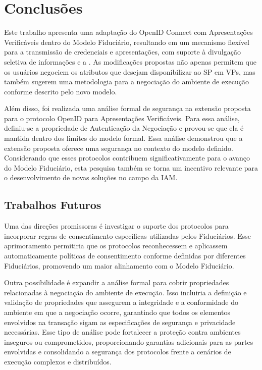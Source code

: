 \newpage
\section{Conclusões} \label{section:conclusion}

Este trabalho apresenta uma adaptação do OpenID Connect com Apresentações Verificáveis dentro do Modelo Fiduciário, resultando em um mecanismo flexível para a transmissão de credenciais e apresentações, com suporte à divulgação seletiva de informações e a . As modificações propostas não apenas permitem que os usuários negociem os atributos que desejam disponibilizar ao \acs{SP} em \acs{VP}s, mas também sugerem uma metodologia para a negociação do ambiente de execução conforme descrito pelo novo modelo. 

Além disso, foi realizada uma análise formal de segurança na extensão proposta para o protocolo OpenID para Apresentações Verificáveis. Para essa análise, definiu-se a propriedade de Autenticação da Negociação e provou-se que ela é mantida dentro dos limites do modelo formal. Essa análise demonstrou que a extensão proposta oferece uma segurança no contexto do modelo definido. Considerando que esses protocolos contribuem significativamente para o avanço do Modelo Fiduciário, esta pesquisa também se torna um incentivo relevante para o desenvolvimento de novas soluções no campo da \acs{IAM}.

\subsection*{Trabalhos Futuros}

Uma das direções promissoras é investigar o suporte dos protocolos para incorporar regras de consentimento específicas utilizadas pelos Fiduciários. Esse aprimoramento permitiria que os protocolos reconhecessem e aplicassem automaticamente políticas de consentimento conforme definidas por diferentes Fiduciários, promovendo um maior alinhamento com o Modelo Fiduciário.

Outra possibilidade é expandir a análise formal para cobrir propriedades relacionadas à negociação do ambiente de execução. Isso incluiria a definição e validação de propriedades que assegurem a integridade e a conformidade do ambiente em que a negociação ocorre, garantindo que todos os elementos envolvidos na transação sigam as especificações de segurança e privacidade necessárias. Esse tipo de análise pode fortalecer a proteção contra ambientes inseguros ou comprometidos, proporcionando garantias adicionais para as partes envolvidas e consolidando a segurança dos protocolos frente a cenários de execução complexos e distribuídos.